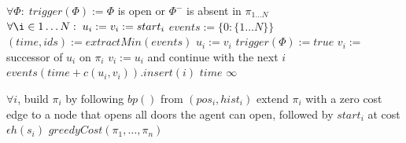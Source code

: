 \documentclass[letterpaper]{article}
\begin{document}
\begin{algorithm}
\caption{$greedyCost(\pi_1,\ldots,\pi_n)$}
\label{alg:update}
\begin{algorithmic}
\STATE $\forall\Phi:\; trigger(\Phi) := \Phi$ is open or $\Phi^-$ is absent in $\pi_{1\ldots N}$
\STATE $\forall \i\in 1\ldots N:\; u_i := v_i := start_i$
\STATE $events := \{0: \{1\ldots N\}\}$
\STATE $(time, ids) := extractMin(events)$
\STATE $u_i := v_i$
\STATE $trigger(\Phi) := true$
\ENDIF
\ENDFOR
\ENDFOR
{}
\STATE $v_i :=$ successor of $u_i$ on $\pi_i$
\STATE $v_i := u_i$ and continue with the next $i$
\ENDIF
\ENDFOR
\STATE $events(time+c(u_i,v_i)).insert(i)$
\ENDFOR
\ENDWHILE
{}
\RETURN $time$
\ELSE
\RETURN $\infty$
\ENDIF
\end{algorithmic}
\end{algorithm}

\begin{algorithm}
\caption{$jointPriority((pos_1,hist_1),\ldots,(pos_N,hist_N))$}
\label{alg:update}
\begin{algorithmic}
\STATE $\forall i$, build $\pi_i$ by following $bp()$ from $(pos_i, hist_i)$
\STATE extend $\pi_i$ with a zero cost edge to a node that opens all doors the agent can open, followed by $start_i$ at cost $\epsilon h(s_i)$
\ENDFOR
\RETURN $greedyCost(\pi_1,\ldots,\pi_n)$
\end{algorithmic}
\end{algorithm}



\end{document}
